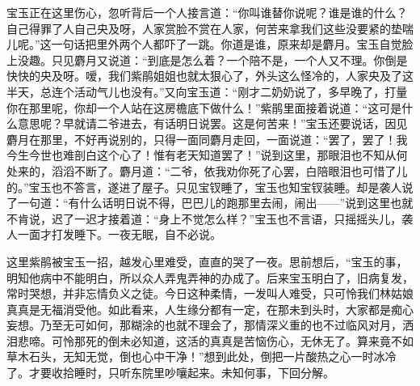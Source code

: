 \begin{parag}
    宝玉正在这里伤心，忽听背后一个人接言道：“你叫谁替你说呢？谁是谁的什么？自己得罪了人自己央及呀，人家赏脸不赏在人家，何苦来拿我们这些没要紧的垫喘儿呢。”这一句话把里外两个人都吓了一跳。你道是谁，原来却是麝月。宝玉自觉脸上没趣。只见麝月又说道：“到底是怎么着？一个陪不是，一个人又不理。你倒是快快的央及呀。嗳，我们紫鹃姐姐也就太狠心了，外头这么怪冷的，人家央及了这半天，总连个活动气儿也没有。”又向宝玉道：“刚才二奶奶说了，多早晚了，打量你在那里呢，你却一个人站在这房檐底下做什么！”紫鹃里面接着说道：“这可是什么意思呢？早就请二爷进去，有话明日说罢。这是何苦来！”宝玉还要说话，因见麝月在那里，不好再说别的，只得一面同麝月走回，一面说道：“罢了，罢了！我今生今世也难剖白这个心了！惟有老天知道罢了！”说到这里，那眼泪也不知从何处来的，滔滔不断了。麝月道：“二爷，依我劝你死了心罢，白陪眼泪也可惜了儿的。”宝玉也不答言，遂进了屋子。只见宝钗睡了，宝玉也知宝钗装睡。却是袭人说了一句道：“有什么话明日说不得，巴巴儿的跑那里去闹，闹出——”说到这里也就不肯说，迟了一迟才接着道：“身上不觉怎么样？”宝玉也不言语，只摇摇头儿，袭人一面才打发睡下。一夜无眠，自不必说。
\end{parag}


\begin{parag}
    这里紫鹃被宝玉一招，越发心里难受，直直的哭了一夜。思前想后，“宝玉的事，明知他病中不能明白，所以众人弄鬼弄神的办成了。后来宝玉明白了，旧病复发，常时哭想，并非忘情负义之徒。今日这种柔情，一发叫人难受，只可怜我们林姑娘真真是无福消受他。如此看来，人生缘分都有一定，在那未到头时，大家都是痴心妄想。乃至无可如何，那糊涂的也就不理会了，那情深义重的也不过临风对月，洒泪悲啼。可怜那死的倒未必知道，这活的真真是苦恼伤心，无休无了。算来竟不如草木石头，无知无觉，倒也心中干净！”想到此处，倒把一片酸热之心一时冰冷了。才要收拾睡时，只听东院里吵嚷起来。未知何事，下回分解。
\end{parag}